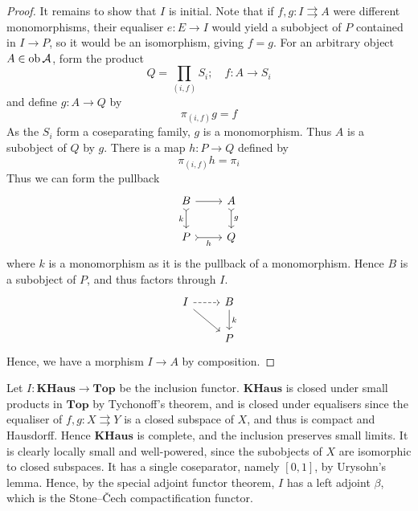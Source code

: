 \begin{proof}
    It remains to show that \( I \) is initial.
    Note that if \( f, g : I \rightrightarrows A \) were different monomorphisms, their equaliser \( e : E \to I \) would yield a subobject of \( P \) contained in \( I \to P \), so it would be an isomorphism, giving \( f = g \).
    For an arbitrary object \( A \in \operatorname{ob} \mathcal A \), form the product
    \[ Q = \prod_{(i,f)} S_i;\quad f : A \to S_i \]
    and define \( g : A \to Q \) by
    \[ \pi_{(i,f)} g = f \]
    As the \( S_i \) form a coseparating family, \( g \) is a monomorphism.
    Thus \( A \) is a subobject of \( Q \) by \( g \).
    There is a map \( h : P \to Q \) defined by
    \[ \pi_{(i,f)} h = \pi_i \]
    Thus we can form the pullback
\[\begin{tikzcd}
	B & A \\
	P & Q
	\arrow[from=1-1, to=1-2]
	\arrow["g", tail, from=1-2, to=2-2]
	\arrow["k"', tail, from=1-1, to=2-1]
	\arrow["h"', tail, from=2-1, to=2-2]
\end{tikzcd}\]
    where \( k \) is a monomorphism as it is the pullback of a monomorphism.
    Hence \( B \) is a subobject of \( P \), and thus factors through \( I \).
\[\begin{tikzcd}
	I & B \\
	& P
	\arrow[dashed, from=1-1, to=1-2]
	\arrow["k", from=1-2, to=2-2]
	\arrow[from=1-1, to=2-2]
\end{tikzcd}\]
    Hence, we have a morphism \( I \to A \) by composition.
\end{proof}
\begin{example}
    Let \( I : \mathbf{KHaus} \to \mathbf{Top} \) be the inclusion functor.
    \( \mathbf{KHaus} \) is closed under small products in \( \mathbf{Top} \) by Tychonoff's theorem, and is closed under equalisers since the equaliser of \( f, g : X \rightrightarrows Y \) is a closed subspace of \( X \), and thus is compact and Hausdorff.
    Hence \( \mathbf{KHaus} \) is complete, and the inclusion preserves small limits.
    It is clearly locally small and well-powered, since the subobjects of \( X \) are isomorphic to closed subspaces.
    It has a single coseparator, namely \( [0,1] \), by Urysohn's lemma.
    Hence, by the special adjoint functor theorem, \( I \) has a left adjoint \( \beta \), which is the Stone--\v{C}ech compactification functor.
\end{example}
